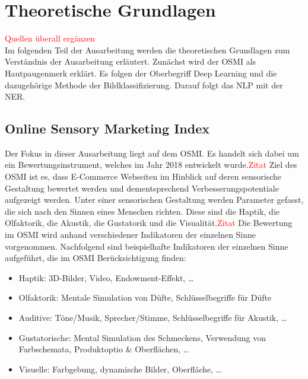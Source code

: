 \newpage
\section{Theoretische Grundlagen}
\textcolor{red}{Quellen überall ergänzen} \\
Im folgenden Teil der Ausarbeitung werden die theoretischen Grundlagen zum Verständnis der Ausarbeitung erläutert.
Zunächst wird der \ac{OSMI} als Hautpaugenmerk erklärt. Es folgen der Oberbegriff Deep Learning und die dazugehörige Methode der Bildklassifizierung.
Darauf folgt das \ac{NLP} mit der \ac{NER}.

\subsection{Online Sensory Marketing Index}

Der Fokus in dieser Ausarbeitung liegt auf dem \acl{OSMI}. Es handelt sich dabei um ein Bewertungsinstrument, welches im Jahr 2018 entwickelt wurde.\textcolor{red}{Zitat}
Ziel des \ac{OSMI} ist es, dass E-Commerce Webseiten im Hinblick auf deren sensorische Gestaltung bewertet werden und dementsprechend Verbesserungspotentiale aufgezeigt werden.
Unter einer sensorischen Gestaltung werden Parameter gefasst, die sich nach den Sinnen eines Menschen richten. Diese sind die Haptik, die Olfaktorik, die Akustik, die Gustatorik und die Visualität.\textcolor{red}{Zitat}
Die Bewertung im \ac{OSMI} wird anhand verschiedener Indikatoren der einzelnen Sinne vorgenommen. Nachfolgend sind beispielhafte Indikatoren der einzelnen Sinne aufgeführt, die im \ac{OSMI} Berücksichtigung finden:

\begin{itemize}
    \item Haptik: 3D-Bilder, Video, Endowment-Effekt, …
    \item Olfaktorik: Mentale Simulation von Düfte, Schlüsselbegriffe für Düfte
    \item Auditive: Töne/Musik, Sprecher/Stimme, Schlüsselbegriffe für Akustik, …
    \item Gustatorische: Mental Simulation des Schmeckens, Verwendung von
    Farbschemata, Produktoptio \& Oberflächen, …
    \item Visuelle: Farbgebung, dynamische Bilder, Oberfläche, …
\end{itemize}

